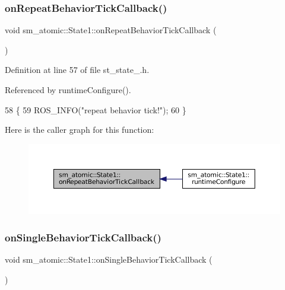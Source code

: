\subsubsection{\texorpdfstring{on\+Repeat\+Behavior\+Tick\+Callback()}{onRepeatBehaviorTickCallback()}}
{\footnotesize\ttfamily void sm\+\_\+atomic\+::\+State1\+::on\+Repeat\+Behavior\+Tick\+Callback (\begin{DoxyParamCaption}{ }\end{DoxyParamCaption})\hspace{0.3cm}{\ttfamily [inline]}}



Definition at line 57 of file st\+\_\+state\+\_.\+h.



Referenced by runtime\+Configure().


\begin{DoxyCode}
58     \{
59         ROS\_INFO(\textcolor{stringliteral}{"repeat behavior tick!"});
60     \}
\end{DoxyCode}
Here is the caller graph for this function\+:
\nopagebreak
\begin{figure}[H]
\begin{center}
\leavevmode
\includegraphics[width=350pt]{structsm__atomic_1_1State1_a9d2c943f02a8e0f1d7b86132ada1c6e0_icgraph}
\end{center}
\end{figure}
\mbox{\label{structsm__atomic_1_1State1_a9cb95d91cf5a22f0d9d079dc04bf58aa}} 
\subsubsection{\texorpdfstring{on\+Single\+Behavior\+Tick\+Callback()}{onSingleBehaviorTickCallback()}}
{\footnotesize\ttfamily void sm\+\_\+atomic\+::\+State1\+::on\+Single\+Behavior\+Tick\+Callback (\begin{DoxyParamCaption}{ }\end{DoxyParamCaption})\hspace{0.3cm}{\ttfamily [inline]}}



